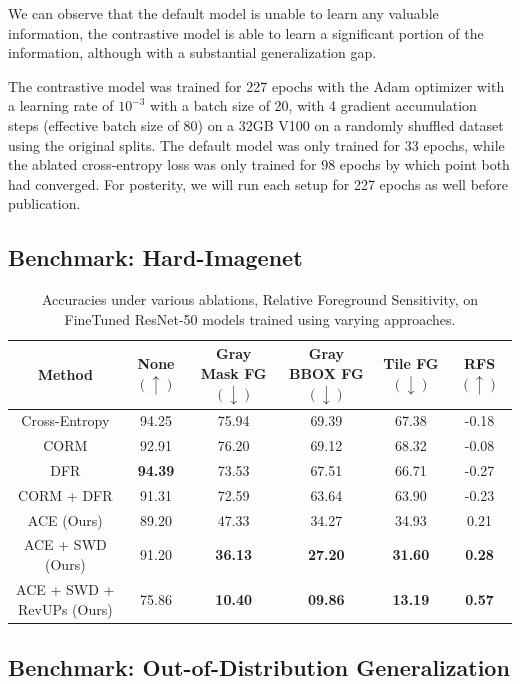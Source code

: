 \documentclass{article}
\theoremstyle{plain}
\theoremstyle{definition}
\theoremstyle{remark}
\begin{document}
We can observe that the default model is unable to learn any valuable information, the contrastive model is able to learn a significant portion of the information, although with a substantial generalization gap.

The contrastive model was trained for 227 epochs with the Adam optimizer with a learning rate of $10^{-3}$ with a batch size of 20, with 4 gradient accumulation steps (effective batch size of 80) on a 32GB V100 on a randomly shuffled dataset using the original splits. The default model was only trained for 33 epochs, while the ablated cross-entropy loss was only trained for 98 epochs by which point both had converged. For posterity, we will run each setup for 227 epochs as well before publication.

\subsection{Benchmark: Hard-Imagenet}
\begin{table}[h!]
	\caption{Accuracies under various ablations, Relative Foreground Sensitivity, on FineTuned ResNet-50 models trained using varying approaches.}
	\centering
	\hspace*{-4em}
	\begin{tabular}{c|c|ccc|c}
		\toprule
		\textbf{Method} & \textbf{None} $(\uparrow)$ & \textbf{Gray Mask FG} $(\downarrow)$ & \textbf{Gray BBOX FG} $(\downarrow)$ & \textbf{Tile FG} $(\downarrow)$ & \textbf{RFS} $(\uparrow)$ \\
		\midrule
		Cross-Entropy & 94.25 & 75.94 & 69.39 & 67.38 & -0.18 \\
		\midrule
		CORM & 92.91 & 76.20 & 69.12 & 68.32 & -0.08 \\
		DFR & \bf 94.39 & 73.53 & 67.51 & 66.71 & -0.27 \\
		CORM + DFR & 91.31 & 72.59 & 63.64 & 63.90 & -0.23 \\
		\midrule
		ACE (Ours) & 89.20 & 47.33 & 34.27 & 34.93 & 0.21 \\
		ACE + SWD (Ours) & 91.20 & \bf 36.13 & \bf 27.20 & \bf 31.60 & \bf 0.28 \\
		ACE + SWD + RevUPs (Ours) & 75.86 & \bf 10.40 & \bf 09.86 & \bf 13.19 & \bf 0.57 \\
		\bottomrule
	\end{tabular}
\end{table}

\subsection{Benchmark: Out-of-Distribution Generalization}
\end{document}
